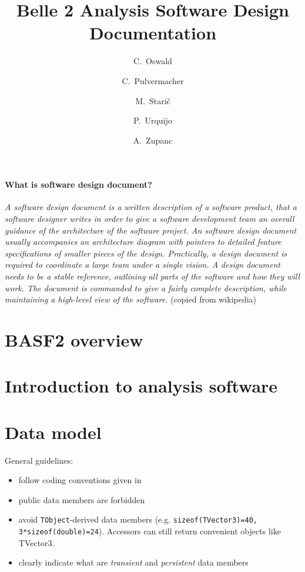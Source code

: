 \documentclass[a4paper,11pt]{article}
\title{\boldmath Belle 2 Analysis Software Design Documentation}
\author[a]{C.~Oswald}
\author[b]{C.~Pulvermacher}
\author[c]{M.~Stari\v{c}}
\author[a]{P.~Urquijo}
\author[b]{A.~Zupanc}
\affiliation[a]{University of Bonn, Bonn, Germany}
\affiliation[b]{Karlsruhe Insitute Of Technology, Karlsruhe, Germany}
\affiliation[c]{Jo\v{z}ef Stefan Institute, Ljubljana, Slovenia}
\begin{document}
 
\maketitle
\flushbottom

\paragraph{What is software design document?}

{\it A software design document is a written description of a software product, that a software designer 
writes in order to give a software development team an overall guidance of the architecture of the software 
project. An software design document usually accompanies an architecture diagram with pointers to detailed 
feature specifications of smaller pieces of the design. Practically, a design document is required to coordinate 
a large team under a single vision. A design document needs to be a stable reference, outlining all parts of 
the software and how they will work. The document is commanded to give a fairly complete description, while 
maintaining a high-level view of the software.} (copied from wikipedia)

\section{BASF2 overview}


\section{Introduction to analysis software}


\section{Data model}

General guidelines:
\begin{itemize}
 \item follow coding conventions given in \cite{basf2:coding:convention}
 \item public data members are forbidden
 \item avoid {\tt TObject}-derived data members (e.g. {\tt sizeof(TVector3)=40, 3*sizeof(double)=24}). Accessors can still return 
  convenient objects like TVector3. 
 \item clearly indicate what are {\it transient} and {\it persistent} data members
\end{itemize}
    
\end{document}
